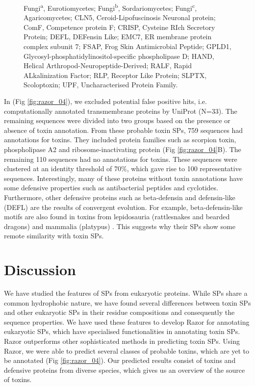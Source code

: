 \begin{figure}
\captionsetup{labelformat=empty}
\caption{
 Fungi\textsuperscript{a}, Eurotiomycetes; Fungi\textsuperscript{b}, Sordariomycetes; Fungi\textsuperscript{c}, Agaricomycetes; CLN5, Ceroid-Lipofuscinosis Neuronal protein; ComF, Competence protein F; CRISP, Cysteine RIch Secretory Protein; DEFL, DEFensin Like; EMC7, ER membrane protein complex subunit 7; FSAP, Frog Skin Antimicrobial Peptide; GPLD1, Glycosyl-phosphatidylinositol-specific phospholipase D; HAND, Helical Arthropod-Neuropeptide-Derived; RALF, Rapid ALkalinization Factor; RLP, Receptor Like Protein; SLPTX, Scoloptoxin; UPF, Uncharacterised Protein Family.
}
\end{figure}



In (Fig \ref{fig:razor_04}), we excluded potential false positive hits, i.e. computationally annotated transmembrane proteins by UniProt (N=33). The remaining sequences were divided into two groups based on the presence or absence of toxin annotation. From these probable toxin SPs, 759 sequences had annotations for toxins. They included protein families such as scorpion toxin, phospholipase A2 and ribosome-inactivating protein (Fig \ref{fig:razor_04}B). The remaining 110 sequences had no annotations for toxins. These sequences were clustered at an identity threshold of 70\%, which gave rise to 100 representative sequences. Interestingly, many of these proteins without toxin annotations have some defensive properties such as antibacterial peptides and cyclotides. Furthermore, other defensive proteins such as beta-defensin and defensin-like (DEFL) are the results of convergent evolution. For example, beta-defensin-like motifs are also found in toxins from lepidosauria (rattlesnakes and bearded dragons) and mammalia (platypus) \cite{Fry2009-iu,Fry2010-bs,Whittington2008-vm}. This suggests why their SPs show some remote similarity with toxin SPs.


\section{Discussion}
We have studied the features of SPs from eukaryotic proteins. While SPs share a common hydrophobic nature, we have found several differences between toxin SPs and other eukaryotic SPs in their residue compositions and consequently the sequence properties. We have used these features to develop Razor for annotating eukaryotic SPs, which have specialised functionalities in annotating toxin SPs. Razor outperforms other sophisticated methods in predicting toxin SPs. Using Razor, we were able to predict several classes of probable toxins, which are yet to be annotated (Fig \ref{fig:razor_04}). Our predicted results consist of toxins and defensive proteins from diverse species, which gives us an overview of the source of toxins.

